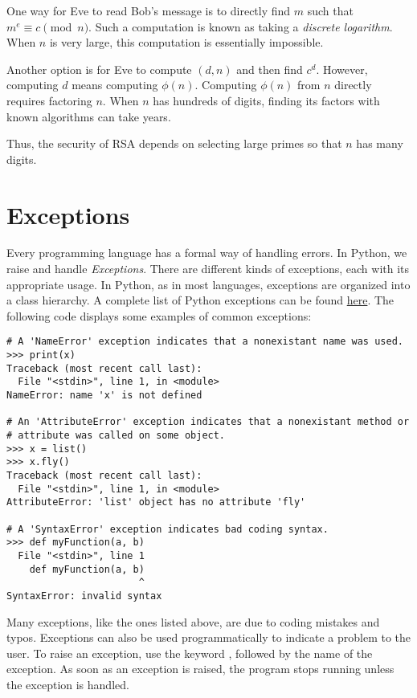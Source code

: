 One way for Eve to read Bob's message is to directly find $m$ such that $m^e \equiv c \pmod{n}$.
Such a computation is known as taking a \emph{discrete logarithm}.
When $n$ is very large, this computation is essentially impossible.

Another option is for Eve to compute $(d, n)$ and then find $c^d$.
However, computing $d$ means computing $\phi(n)$.
Computing $\phi(n)$ from $n$ directly requires factoring $n$.
When $n$ has hundreds of digits, finding its factors with known algorithms can take years.

Thus, the security of RSA depends on selecting large primes so that $n$ has many digits.

\section*{Exceptions}

Every programming language has a formal way of handling errors. In Python, we raise and handle \emph{Exceptions}. There are different kinds of exceptions, each with its appropriate usage.
In Python, as in most languages, exceptions are organized into a class hierarchy.
A complete list of Python exceptions can be found \href{https://docs.python.org/2/library/exceptions.html}{here}.
The following code displays some examples of common exceptions:

\begin{lstlisting}
# A 'NameError' exception indicates that a nonexistant name was used.
>>> print(x)
Traceback (most recent call last):
  File "<stdin>", line 1, in <module>
NameError: name 'x' is not defined

# An 'AttributeError' exception indicates that a nonexistant method or
# attribute was called on some object.
>>> x = list()
>>> x.fly()
Traceback (most recent call last):
  File "<stdin>", line 1, in <module>
AttributeError: 'list' object has no attribute 'fly'

# A 'SyntaxError' exception indicates bad coding syntax.
>>> def myFunction(a, b)
  File "<stdin>", line 1
    def myFunction(a, b)
                       ^
SyntaxError: invalid syntax
\end{lstlisting}

Many exceptions, like the ones listed above, are due to coding mistakes and typos.
Exceptions can also be used programmatically to indicate a problem to the user.
To raise an exception, use the keyword , followed by the name of the exception.
As soon as an exception is raised, the program stops running unless the exception is handled.

